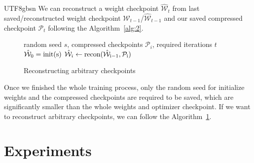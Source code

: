 \documentclass{article}
\theoremstyle{plain}
\theoremstyle{definition}
\theoremstyle{remark}
\begin{document}
\begin{CJK}{UTF8}{gbsn}
We can reconstruct a weight checkpoint $\hat{\mathcal{W}}_t$ from last saved/reconstructed weight checkpoint $\mathcal{W}_{t-1}$/$\hat{\mathcal{W}}_{t-1}$ and our saved compressed checkpoint $\mathcal{P}_t$ following the Algorithm~\ref{alg:2}.

\begin{figure}[t]
\vspace{-3mm}
\begin{algorithm}[H]
\caption{Reconstructing arbitrary checkpoints}
\label{alg:3}
\begin{algorithmic} 
\REQUIRE random seed $s$, compressed checkpoints $\mathcal{P}_{i}$, required iterations $t$
\STATE $\hat{\mathcal{W}}_0 = \rm init(s)$
\STATE $\hat{\mathcal{W}}_i \leftarrow \rm recon(\hat{\mathcal{W}}_{i-1}, \mathcal{P}_{i})$
\ENDWHILE
\end{algorithmic}
\end{algorithm}
\vspace{-11mm}
\end{figure}

Once we finished the whole training process, only the random seed for initialize weights and the compressed checkpoints are required to be saved, which are significantly smaller than the whole weights and optimizer checkpoint. If we want to reconstruct arbitrary checkpoints, we can follow the Algorithm~\ref{alg:3}.

\section{Experiments}
\label{sec:exp}



\end{CJK}
\end{document}
